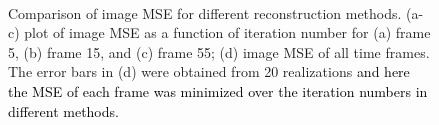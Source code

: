 \documentclass[]{IEEETran}
\newcommand{\txtb}[1]{\textcolor{black}{#1}}
\begin{document}
	\begin{figure}[h!]
		\vspace{-20pt}
		\centering
		\\
		\caption{Comparison of image MSE for different reconstruction methods. (a-c) plot of image MSE as a function of iteration number for (a) frame 5, (b) frame 15, and (c) frame 55; (d) image MSE of all time frames. The error bars in (d) were obtained from 20 realizations \txtb{and here the MSE of each frame was minimized over the iteration numbers in different methods.}}
		\label{fig:MSE}	
	\end{figure}
\end{document}
